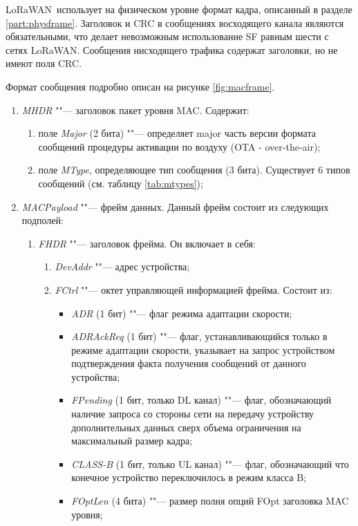 LoRaWAN\texttrademark~использует на физическом уровне формат кадра, описанный в 
разделе \ref{part:physframe}.
Заголовок и CRC в сообщениях восходящего канала являются обязательными, что 
делает невозможным использование SF равным шести с сетях LoRaWAN\texttrademark.
Сообщения нисходящего трафика содержат заголовки, но не имеют поля CRC.

Формат сообщения подробно описан на рисунке \ref{fig:macframe}.

\begin{enumerate}
 \item \textit{MHDR} ""--- заголовок пакет уровня MAC. Содержит:
 
 \begin{enumerate}
  \item поле \textit{Major} (2 бита) ""--- определяет major часть версии 
формата 
сообщений процедуры активации по воздуху (OTA - over-the-air);
  \item поле \textit{MType}, определяющее тип сообщения (3 бита). Существует 6 
типов сообщений (см. таблицу \ref{tab:mtypes});
 \end{enumerate}
 
 \item \textit{MACPayload} ""--- фрейм данных. Данный фрейм состоит из 
следующих 
подполей:
 
 \begin{enumerate}
  \item \textit{FHDR} ""--- заголовок фрейма. Он включает в себя:
  
  \begin{enumerate}
   \item \textit{DevAddr} ""--- адрес устройства;
   \item \textit{FCtrl} ""--- октет управляющей информацией фрейма. Состоит из:
   
   \begin{itemize}
    \item \textit{ADR} (1 бит) ""--- флаг режима адаптации скорости;
    \item \textit{ADRAckReq} (1 бит) ""--- флаг, устанавливающийся только в 
режиме адаптации скорости, указывает на запрос устройством подтверждения факта 
получения сообщений от данного устройства;
    \item \textit{FPending} (1 бит, только DL канал) ""--- флаг, обозначающий 
наличие запроса со стороны сети на передачу устройству дополнительных данных 
сверх объема ограничения на максимальный размер кадра;
    \item \textit{CLASS-B} (1 бит, только UL канал) ""--- флаг, обозначающий 
что 
конечное устройство переключилось в режим класса B;
    \item \textit{FOptLen} (4 бита) ""--- размер полня опций FOpt заголовка MAC 
уровня;
   \end{itemize}
   

\end{enumerate}
\end{enumerate}
\end{enumerate}
